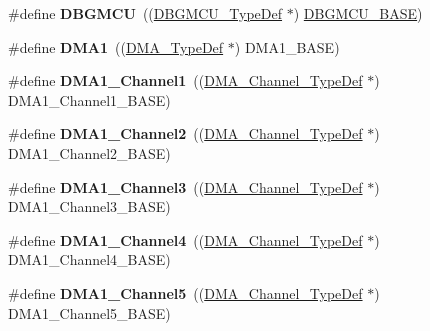 \begin{DoxyCompactItemize}
\item 
\mbox{\label{group___peripheral__declaration_ga92ec6d9ec2251fda7d4ce09748cd74b4}} 
\#define {\bfseries D\+B\+G\+M\+CU}~((\hyperlink{struct_d_b_g_m_c_u___type_def}{D\+B\+G\+M\+C\+U\+\_\+\+Type\+Def} $\ast$) \hyperlink{group___peripheral__memory__map_ga4adaf4fd82ccc3a538f1f27a70cdbbef}{D\+B\+G\+M\+C\+U\+\_\+\+B\+A\+SE})
\item 
\mbox{\label{group___peripheral__declaration_gacc16d2a5937f7585320a98f7f6b578f9}} 
\#define {\bfseries D\+M\+A1}~((\hyperlink{struct_d_m_a___type_def}{D\+M\+A\+\_\+\+Type\+Def} $\ast$) D\+M\+A1\+\_\+\+B\+A\+SE)
\item 
\mbox{\label{group___peripheral__declaration_gac83c5be824be1c02716e2522e80ddf7a}} 
\#define {\bfseries D\+M\+A1\+\_\+\+Channel1}~((\hyperlink{struct_d_m_a___channel___type_def}{D\+M\+A\+\_\+\+Channel\+\_\+\+Type\+Def} $\ast$) D\+M\+A1\+\_\+\+Channel1\+\_\+\+B\+A\+SE)
\item 
\mbox{\label{group___peripheral__declaration_ga23d7631dd10c645e06971b2543ba2949}} 
\#define {\bfseries D\+M\+A1\+\_\+\+Channel2}~((\hyperlink{struct_d_m_a___channel___type_def}{D\+M\+A\+\_\+\+Channel\+\_\+\+Type\+Def} $\ast$) D\+M\+A1\+\_\+\+Channel2\+\_\+\+B\+A\+SE)
\item 
\mbox{\label{group___peripheral__declaration_gacf7b6093a37b306d7f1f50b2f200f0d0}} 
\#define {\bfseries D\+M\+A1\+\_\+\+Channel3}~((\hyperlink{struct_d_m_a___channel___type_def}{D\+M\+A\+\_\+\+Channel\+\_\+\+Type\+Def} $\ast$) D\+M\+A1\+\_\+\+Channel3\+\_\+\+B\+A\+SE)
\item 
\mbox{\label{group___peripheral__declaration_gad2c42743316bf64da557130061b1f56a}} 
\#define {\bfseries D\+M\+A1\+\_\+\+Channel4}~((\hyperlink{struct_d_m_a___channel___type_def}{D\+M\+A\+\_\+\+Channel\+\_\+\+Type\+Def} $\ast$) D\+M\+A1\+\_\+\+Channel4\+\_\+\+B\+A\+SE)
\item 
\mbox{\label{group___peripheral__declaration_ga06ff98ddef3c962795d2e2444004abff}} 
\#define {\bfseries D\+M\+A1\+\_\+\+Channel5}~((\hyperlink{struct_d_m_a___channel___type_def}{D\+M\+A\+\_\+\+Channel\+\_\+\+Type\+Def} $\ast$) D\+M\+A1\+\_\+\+Channel5\+\_\+\+B\+A\+SE)

\end{DoxyCompactItemize}
